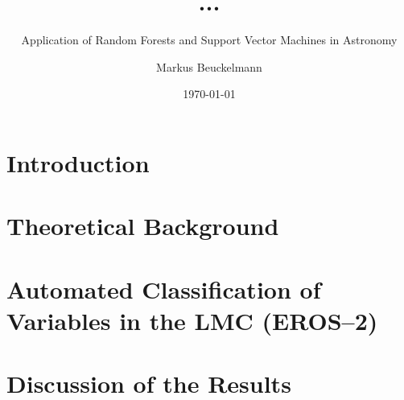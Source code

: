 

\title{...}
\subtitle{Application of Random Forests and Support Vector Machines in Astronomy}

\author{Markus Beuckelmann}
\date{\today}






\label{sec:abstract}

\tableofcontents

\newpage

\chapter{Introduction}
\label{sec:introduction}


\let\cleardoublepage\clearpage
\chapter{Theoretical Background}
\label{sec:theory}


\chapter{Automated Classification of Variables in the LMC (EROS--2)}
\label{sec:main}


%

\chapter{Discussion of the Results}
\label{sec:discussion}


\cleardoublepage
{}
\listoffigures

\cleardoublepage
{}




\clearpage
{}

\label{sec:declaration}


